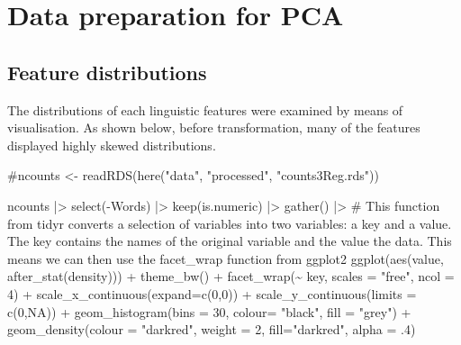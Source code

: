 \documentclass[
  letterpaper,
  DIV=11,
  numbers=noendperiod]{scrreprt}
\newenvironment{Shaded}{\begin{snugshade}}{\end{snugshade}}
\newcommand{\AttributeTok}[1]{\textcolor[rgb]{0.40,0.45,0.13}{#1}}
\newcommand{\CommentTok}[1]{\textcolor[rgb]{0.37,0.37,0.37}{#1}}
\newcommand{\ConstantTok}[1]{\textcolor[rgb]{0.56,0.35,0.01}{#1}}
\newcommand{\DecValTok}[1]{\textcolor[rgb]{0.68,0.00,0.00}{#1}}
\newcommand{\FunctionTok}[1]{\textcolor[rgb]{0.28,0.35,0.67}{#1}}
\newcommand{\NormalTok}[1]{\textcolor[rgb]{0.00,0.23,0.31}{#1}}
\newcommand{\SpecialCharTok}[1]{\textcolor[rgb]{0.37,0.37,0.37}{#1}}
\newcommand{\StringTok}[1]{\textcolor[rgb]{0.13,0.47,0.30}{#1}}
\begin{document}
\section{Data preparation for PCA}\label{data-preparation-for-pca-1}

\subsection{Feature distributions}\label{feature-distributions-1}

The distributions of each linguistic features were examined by means of
visualisation. As shown below, before transformation, many of the
features displayed highly skewed distributions.

\begin{Shaded}
\begin{Highlighting}[]
\CommentTok{\#ncounts \textless{}{-} readRDS(here("data", "processed", "counts3Reg.rds"))}

\NormalTok{ncounts }\SpecialCharTok{|\textgreater{}}
  \FunctionTok{select}\NormalTok{(}\SpecialCharTok{{-}}\NormalTok{Words) }\SpecialCharTok{|\textgreater{}} 
  \FunctionTok{keep}\NormalTok{(is.numeric) }\SpecialCharTok{|\textgreater{}} 
  \FunctionTok{gather}\NormalTok{() }\SpecialCharTok{|\textgreater{}} \CommentTok{\# This function from tidyr converts a selection of variables into two variables: a key and a value. The key contains the names of the original variable and the value the data. This means we can then use the facet\_wrap function from ggplot2}
  \FunctionTok{ggplot}\NormalTok{(}\FunctionTok{aes}\NormalTok{(value, }\FunctionTok{after\_stat}\NormalTok{(density))) }\SpecialCharTok{+}
    \FunctionTok{theme\_bw}\NormalTok{() }\SpecialCharTok{+}
    \FunctionTok{facet\_wrap}\NormalTok{(}\SpecialCharTok{\textasciitilde{}}\NormalTok{ key, }\AttributeTok{scales =} \StringTok{"free"}\NormalTok{, }\AttributeTok{ncol =} \DecValTok{4}\NormalTok{) }\SpecialCharTok{+}
    \FunctionTok{scale\_x\_continuous}\NormalTok{(}\AttributeTok{expand=}\FunctionTok{c}\NormalTok{(}\DecValTok{0}\NormalTok{,}\DecValTok{0}\NormalTok{)) }\SpecialCharTok{+}
    \FunctionTok{scale\_y\_continuous}\NormalTok{(}\AttributeTok{limits =} \FunctionTok{c}\NormalTok{(}\DecValTok{0}\NormalTok{,}\ConstantTok{NA}\NormalTok{)) }\SpecialCharTok{+}
    \FunctionTok{geom\_histogram}\NormalTok{(}\AttributeTok{bins =} \DecValTok{30}\NormalTok{, }\AttributeTok{colour=} \StringTok{"black"}\NormalTok{, }\AttributeTok{fill =} \StringTok{"grey"}\NormalTok{) }\SpecialCharTok{+}
    \FunctionTok{geom\_density}\NormalTok{(}\AttributeTok{colour =} \StringTok{"darkred"}\NormalTok{, }\AttributeTok{weight =} \DecValTok{2}\NormalTok{, }\AttributeTok{fill=}\StringTok{"darkred"}\NormalTok{, }\AttributeTok{alpha =}\NormalTok{ .}\DecValTok{4}\NormalTok{)}
\end{Highlighting}
\end{Shaded}
\end{document}
